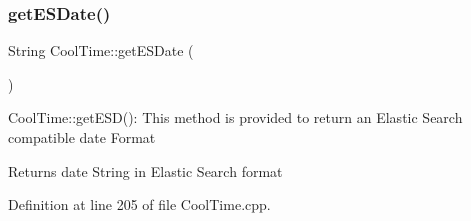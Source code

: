 \subsubsection{\texorpdfstring{get\+E\+S\+Date()}{getESDate()}}
{\footnotesize\ttfamily String Cool\+Time\+::get\+E\+S\+Date (\begin{DoxyParamCaption}{ }\end{DoxyParamCaption})}

Cool\+Time\+::get\+E\+S\+D()\+: This method is provided to return an Elastic Search compatible date Format

\begin{DoxyReturn}{Returns}
date String in Elastic Search format 
\end{DoxyReturn}


Definition at line 205 of file Cool\+Time.\+cpp.


